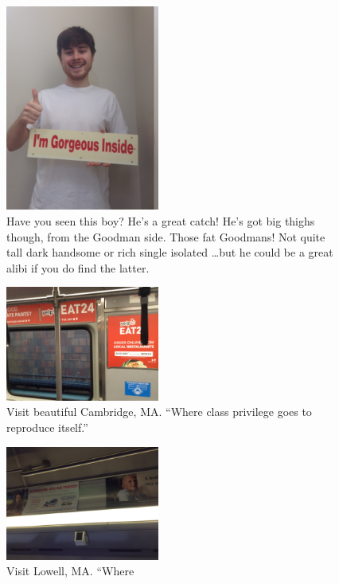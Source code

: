 \begin{figure}
\centering
\includegraphics[width=0.45\textwidth]{figures/ad.jpg}
\caption{Have you seen this boy? He's a great catch! He's got big thighs though, from the Goodman side. Those fat Goodmans! Not quite \checkmark tall \checkmark dark \checkmark handsome or \checkmark rich \checkmark single \checkmark isolated \ldots but he could be a great \checkmark alibi if you do find the latter.}
\end{figure}

\begin{figure}
\centering
\includegraphics[width=0.45\textwidth]{figures/cambridge.jpg}
\caption{Visit beautiful Cambridge, MA. ``Where class privilege goes to reproduce itself.''}
\end{figure}

\begin{figure}
\centering
\includegraphics[width=0.45\textwidth]{figures/lowell.jpg}
\caption{Visit Lowell, MA. ``Where}
\end{figure}

